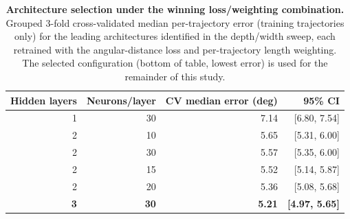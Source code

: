 \documentclass[11pt]{article}
\begin{document}
\begin{table}[h!]
    \centering
    \caption{\textbf{Architecture selection under the winning loss/weighting combination.} Grouped 3-fold cross-validated median per-trajectory error (training trajectories only) for the leading architectures identified in the depth/width sweep, each retrained with the angular-distance loss and per-trajectory length weighting. The selected configuration (bottom of table, lowest error) is used for the remainder of this study.}
    \begin{tabular}{@{}rrrr@{}}
        \toprule
        Hidden layers & Neurons/layer & CV median error (deg) & 95\% CI \\
        \midrule
        1 & 30 & 7.14 & [6.80, 7.54] \\
        2 & 10 & 5.65 & [5.31, 6.00] \\
        2 & 30 & 5.57 & [5.35, 6.00] \\
        2 & 15 & 5.52 & [5.14, 5.87] \\
        2 & 20 & 5.36 & [5.08, 5.68] \\
        \textbf{3} & \textbf{30} & \textbf{5.21} & \textbf{[4.97, 5.65]} \\
        \bottomrule
    \end{tabular}
    \label{tab:archsearch}
\end{table}
\end{document}
